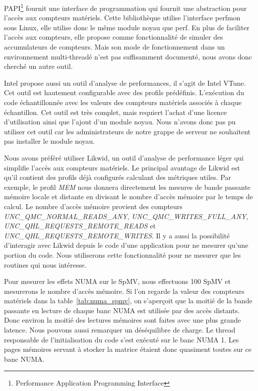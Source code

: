 PAPI\footnote{Performance Application Programming Interface} fournit une interface de programmation qui fournit une abstraction pour l'accès aux compteurs matériels.
%
Cette bibliothèque utilise l'interface perfmon sous Linux, elle utilise donc le même module noyau que perf.
%
En plus de faciliter l'accès aux compteurs, elle propose comme fonctionnalité de simuler des accumulateurs de compteurs.
%
Mais son mode de fonctionnement dans un environnement multi-threadé n'est pas suffisamment documenté, nous avons donc cherché un autre outil.



Intel propose aussi un outil d'analyse de performances, il s'agit de Intel VTune.
%
Cet outil est hautement configurable avec des profils prédéfinis.
%
L'exécution du code échantillonnée avec les valeurs des compteurs matériels associés à chaque échantillon.
%
Cet outil est très complet, mais requiert l'achat d'une licence d'utilisation ainsi que l'ajout d'un module noyau.
%
Nous n'avons donc pas pu utiliser cet outil car les administrateurs de notre grappe de serveur ne souhaitent pas installer le module noyau.



Nous avons préféré utiliser Likwid, un outil d'analyse de performance léger qui simplifie l'accès aux compteurs matériels.
%
Le principal avantage de Likwid est qu'il contient des profils déjà configurés calculant des métriques utiles.
%
Par exemple, le profil {\em MEM} nous donnera directement les mesures de bande passante mémoire locale et distante en divisant le nombre d'accès mémoire par le temps de calcul.
%
Le nombre d'accès mémoire provient des compteurs {\em UNC\_QMC\_NORMAL\_READS\_ANY}, {\em UNC\_QMC\_WRITES\_FULL\_ANY}, {\em UNC\_QHL\_REQUESTS\_REMOTE\_READS} et {\em UNC\_QHL\_REQUESTS\_REMOTE\_WRITES}.
%
Il y a aussi la possibilité d'interagir avec Likwid depuis le code d'une application pour ne mesurer qu'une portion du code.
%
Nous utiliserons cette fonctionnalité pour ne mesurer que les routines qui nous intéresse.



Pour mesurer les effets NUMA sur le SpMV, nous effectuons 100 SpMV et mesurerons le nombre d'accès mémoire.
%
Si l'on regarde la valeur des compteurs matériels dans la table~\ref{tab:numa_spmv}, on s'aperçoit que la moitié de la bande passante en lecture de chaque banc NUMA est utilisée par des accès distants.
%
Donc environ la moitié des lectures mémoires sont faites avec une plus grande latence.
%
Nous pouvons aussi remarquer un déséquilibre de charge.
%
Le thread responsable de l'initialisation du code s'est exécuté sur le banc NUMA 1.
%
Les pages mémoires servant à stocker la matrice étaient donc quasiment toutes sur ce banc NUMA.

